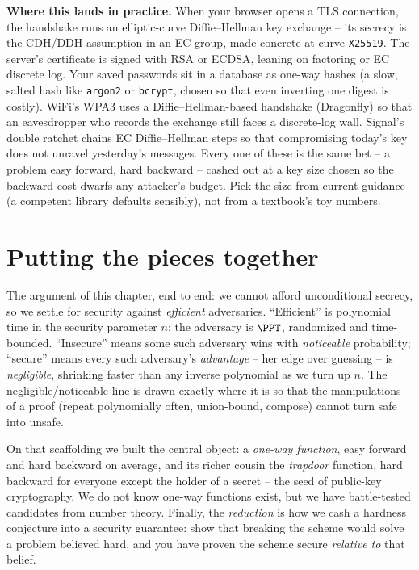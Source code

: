 \begin{applicationbox}
\textbf{Where this lands in practice.} When your browser opens a TLS connection, the handshake runs an elliptic-curve Diffie--Hellman key exchange -- its secrecy is the CDH/DDH assumption in an EC group, made concrete at curve \texttt{X25519}. The server's certificate is signed with RSA or ECDSA, leaning on factoring or EC discrete log. Your saved passwords sit in a database as one-way hashes (a slow, salted hash like \texttt{argon2} or \texttt{bcrypt}, chosen so that even inverting one digest is costly). WiFi's WPA3 uses a Diffie--Hellman-based handshake (Dragonfly) so that an eavesdropper who records the exchange still faces a discrete-log wall. Signal's double ratchet chains EC Diffie--Hellman steps so that compromising today's key does not unravel yesterday's messages. Every one of these is the same bet -- a problem easy forward, hard backward -- cashed out at a key size chosen so the backward cost dwarfs any attacker's budget. Pick the size from current guidance (a competent library defaults sensibly), not from a textbook's toy numbers.
\end{applicationbox}

\section{Putting the pieces together}
\label{ch08:summary}

The argument of this chapter, end to end: we cannot afford unconditional secrecy, so we settle for security against \emph{efficient} adversaries. ``Efficient'' is polynomial time in the security parameter $n$; the adversary is $\PPT$, randomized and time-bounded. ``Insecure'' means some such adversary wins with \emph{noticeable} probability; ``secure'' means every such adversary's \emph{advantage} -- her edge over guessing -- is \emph{negligible}, shrinking faster than any inverse polynomial as we turn up $n$. The negligible/noticeable line is drawn exactly where it is so that the manipulations of a proof (repeat polynomially often, union-bound, compose) cannot turn safe into unsafe.

On that scaffolding we built the central object: a \emph{one-way function}, easy forward and hard backward on average, and its richer cousin the \emph{trapdoor} function, hard backward for everyone except the holder of a secret -- the seed of public-key cryptography. We do not know one-way functions exist, but we have battle-tested candidates from number theory. Finally, the \emph{reduction} is how we cash a hardness conjecture into a security guarantee: show that breaking the scheme would solve a problem believed hard, and you have proven the scheme secure \emph{relative to} that belief.

